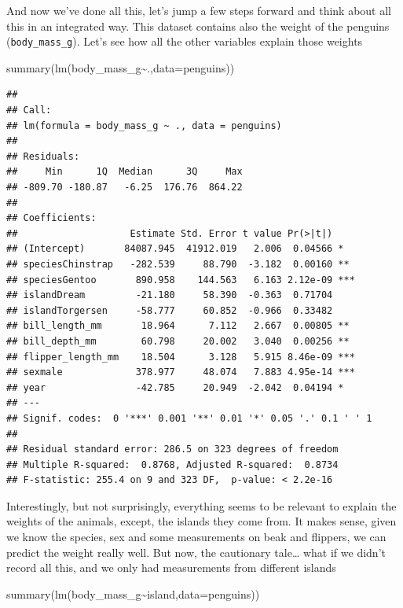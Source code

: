 \documentclass[
]{book}
\newenvironment{Shaded}{\begin{snugshade}}{\end{snugshade}}
\newcommand{\AttributeTok}[1]{\textcolor[rgb]{0.77,0.63,0.00}{#1}}
\newcommand{\FunctionTok}[1]{\textcolor[rgb]{0.00,0.00,0.00}{#1}}
\newcommand{\NormalTok}[1]{#1}
\newcommand{\SpecialCharTok}[1]{\textcolor[rgb]{0.00,0.00,0.00}{#1}}
\begin{document}
And now we've done all this, let's jump a few steps forward and think about all this in an integrated way. This dataset contains also the weight of the penguins (\texttt{body\_mass\_g}). Let's see how all the other variables explain those weights

\begin{Shaded}
\begin{Highlighting}[]
\FunctionTok{summary}\NormalTok{(}\FunctionTok{lm}\NormalTok{(body\_mass\_g}\SpecialCharTok{\textasciitilde{}}\NormalTok{.,}\AttributeTok{data=}\NormalTok{penguins))}
\end{Highlighting}
\end{Shaded}

\begin{verbatim}
## 
## Call:
## lm(formula = body_mass_g ~ ., data = penguins)
## 
## Residuals:
##     Min      1Q  Median      3Q     Max 
## -809.70 -180.87   -6.25  176.76  864.22 
## 
## Coefficients:
##                    Estimate Std. Error t value Pr(>|t|)    
## (Intercept)       84087.945  41912.019   2.006  0.04566 *  
## speciesChinstrap   -282.539     88.790  -3.182  0.00160 ** 
## speciesGentoo       890.958    144.563   6.163 2.12e-09 ***
## islandDream         -21.180     58.390  -0.363  0.71704    
## islandTorgersen     -58.777     60.852  -0.966  0.33482    
## bill_length_mm       18.964      7.112   2.667  0.00805 ** 
## bill_depth_mm        60.798     20.002   3.040  0.00256 ** 
## flipper_length_mm    18.504      3.128   5.915 8.46e-09 ***
## sexmale             378.977     48.074   7.883 4.95e-14 ***
## year                -42.785     20.949  -2.042  0.04194 *  
## ---
## Signif. codes:  0 '***' 0.001 '**' 0.01 '*' 0.05 '.' 0.1 ' ' 1
## 
## Residual standard error: 286.5 on 323 degrees of freedom
## Multiple R-squared:  0.8768, Adjusted R-squared:  0.8734 
## F-statistic: 255.4 on 9 and 323 DF,  p-value: < 2.2e-16
\end{verbatim}

Interestingly, but not surprisingly, everything seems to be relevant to explain the weights of the animals, except, the islands they come from. It makes sense, given we know the species, sex and some measurements on beak and flippers, we can predict the weight really well. But now, the cautionary tale\ldots{} what if we didn't record all this, and we only had measurements from different islands

\begin{Shaded}
\begin{Highlighting}[]
\FunctionTok{summary}\NormalTok{(}\FunctionTok{lm}\NormalTok{(body\_mass\_g}\SpecialCharTok{\textasciitilde{}}\NormalTok{island,}\AttributeTok{data=}\NormalTok{penguins))}
\end{Highlighting}
\end{Shaded}
\end{document}
